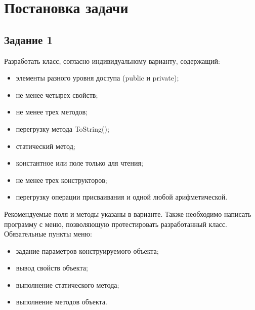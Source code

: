\chapter{Постановка задачи}

\section{Задание 1}

Разработать класс, согласно индивидуальному варианту, содержащий:

\begin{itemize}
	\item элементы разного уровня доступа (public и private);
	\item не менее четырех свойств; 
	\item не менее трех методов;
	\item перегрузку метода ToString();
	\item статический метод;
	\item константное или поле только для чтения;
	\item не менее трех конструкторов;
	\item перегрузку операции присваивания и одной любой арифметической.
\end{itemize}


Рекомендуемые поля и методы указаны в варианте. Также необходимо написать программу с меню, позволяющую протестировать
разработанный класс. Обязательные пункты меню:
\begin{itemize}
	\item задание параметров конструируемого объекта;
	\item вывод свойств объекта;
	\item выполнение статического метода;
	\item выполнение методов объекта.
\end{itemize}

